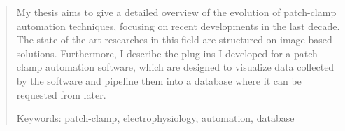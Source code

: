 \documentclass[12pt,a4paper]{report}
\begin{document}
\begin{abstract}
My thesis aims to give a detailed overview of the evolution of patch-clamp automation techniques, focusing on recent developments in the last decade. The state-of-the-art researches in this field are structured on image-based solutions. Furthermore, I describe the plug-ins I developed for a patch-clamp automation software, which are designed to visualize data collected by the software and pipeline them into a database where it can be requested from later.

\vspace{1cm}

Keywords: patch-clamp, electrophysiology, automation, database
\end{abstract}


\printnomenclature

\setcounter{page}{2}

\tableofcontents
\end{document}
